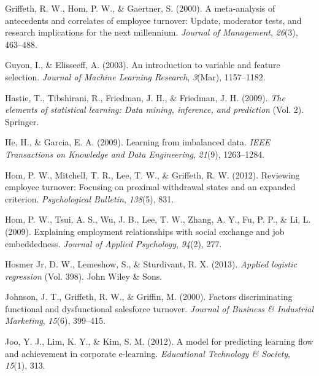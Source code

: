 \documentclass[
  man]{apa7}
\newlength{\cslhangindent}
\newlength{\cslentryspacingunit} %
\newenvironment{CSLReferences}[2] %
 {%
  \setlength{\parindent}{0pt}
  \ifodd #1
  \let\oldpar\par
  \def\par{\hangindent=\cslhangindent\oldpar}
  \fi
  \setlength{\parskip}{#2\cslentryspacingunit}
 }%
 {}
\begin{document}
\begin{CSLReferences}{1}{0}
\leavevmode{}%
Griffeth, R. W., Hom, P. W., \& Gaertner, S. (2000). A meta-analysis of antecedents and correlates of employee turnover: Update, moderator tests, and research implications for the next millennium. \emph{Journal of Management}, \emph{26}(3), 463--488.

\leavevmode{}%
Guyon, I., \& Elisseeff, A. (2003). An introduction to variable and feature selection. \emph{Journal of Machine Learning Research}, \emph{3}(Mar), 1157--1182.

\leavevmode{}%
Hastie, T., Tibshirani, R., Friedman, J. H., \& Friedman, J. H. (2009). \emph{The elements of statistical learning: Data mining, inference, and prediction} (Vol. 2). Springer.

\leavevmode{}%
He, H., \& Garcia, E. A. (2009). Learning from imbalanced data. \emph{IEEE Transactions on Knowledge and Data Engineering}, \emph{21}(9), 1263--1284.

\leavevmode{}%
Hom, P. W., Mitchell, T. R., Lee, T. W., \& Griffeth, R. W. (2012). Reviewing employee turnover: Focusing on proximal withdrawal states and an expanded criterion. \emph{Psychological Bulletin}, \emph{138}(5), 831.

\leavevmode{}%
Hom, P. W., Tsui, A. S., Wu, J. B., Lee, T. W., Zhang, A. Y., Fu, P. P., \& Li, L. (2009). Explaining employment relationships with social exchange and job embeddedness. \emph{Journal of Applied Psychology}, \emph{94}(2), 277.

\leavevmode{}%
Hosmer Jr, D. W., Lemeshow, S., \& Sturdivant, R. X. (2013). \emph{Applied logistic regression} (Vol. 398). John Wiley \& Sons.

\leavevmode{}%
Johnson, J. T., Griffeth, R. W., \& Griffin, M. (2000). Factors discriminating functional and dysfunctional salesforce turnover. \emph{Journal of Business \& Industrial Marketing}, \emph{15}(6), 399--415.

\leavevmode{}%
Joo, Y. J., Lim, K. Y., \& Kim, S. M. (2012). A model for predicting learning flow and achievement in corporate e-learning. \emph{Educational Technology \& Society}, \emph{15}(1), 313.


\end{CSLReferences}
\end{document}
